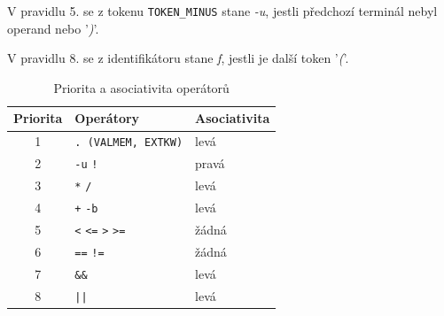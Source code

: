 V pravidlu 5. se z tokenu \texttt{TOKEN\_MINUS} stane \textit{-u}, jestli předchozí terminál nebyl operand nebo '\textit{)}'.

V pravidlu 8. se z identifikátoru stane \textit{f}, jestli je další token '\textit{(}'.

\begin{table}[H]
\centering
\begin{tabular}{|c|l|l|}
\hline
\textbf{Priorita} & \textbf{Operátory} & \textbf{Asociativita} \\
\hline\hline
1 & \texttt{. (VALMEM, EXTKW)} & levá \\ \hline
2 & \texttt{-u} \quad \texttt{!} & pravá \\ \hline
3 & \texttt{*} \quad \texttt{/} & levá \\ \hline
4 & \texttt{+} \quad \texttt{-b} & levá \\ \hline
5 & \texttt{<} \quad \texttt{<=} \quad \texttt{>} \quad \texttt{>=} & žádná \\ \hline
6 & \texttt{==} \quad \texttt{!=} & žádná \\ \hline
7 & \texttt{\&\&} & levá \\ \hline
8 & \texttt{||} & levá \\ \hline
\end{tabular}
\caption{Priorita a asociativita operátorů}
\end{table}